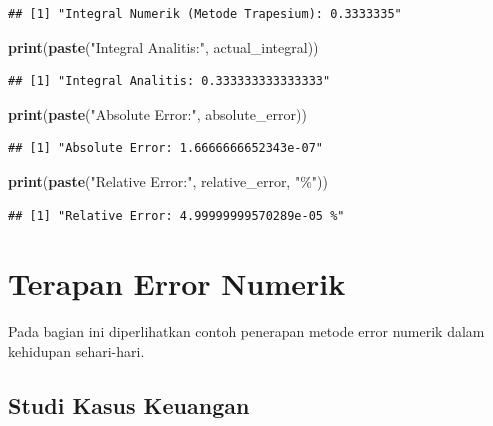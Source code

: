 \documentclass[
]{book}
\newenvironment{Shaded}{\begin{snugshade}}{\end{snugshade}}
\newcommand{\FunctionTok}[1]{\textcolor[rgb]{0.13,0.29,0.53}{\textbf{#1}}}
\newcommand{\NormalTok}[1]{#1}
\newcommand{\StringTok}[1]{\textcolor[rgb]{0.31,0.60,0.02}{#1}}
\theoremstyle{definition}
\theoremstyle{definition}
\theoremstyle{definition}
\theoremstyle{definition}
\theoremstyle{remark}
\begin{document}
\begin{verbatim}
## [1] "Integral Numerik (Metode Trapesium): 0.3333335"
\end{verbatim}

\begin{Shaded}
\begin{Highlighting}[]
\FunctionTok{print}\NormalTok{(}\FunctionTok{paste}\NormalTok{(}\StringTok{"Integral Analitis:"}\NormalTok{, actual\_integral))}
\end{Highlighting}
\end{Shaded}

\begin{verbatim}
## [1] "Integral Analitis: 0.333333333333333"
\end{verbatim}

\begin{Shaded}
\begin{Highlighting}[]
\FunctionTok{print}\NormalTok{(}\FunctionTok{paste}\NormalTok{(}\StringTok{"Absolute Error:"}\NormalTok{, absolute\_error))}
\end{Highlighting}
\end{Shaded}

\begin{verbatim}
## [1] "Absolute Error: 1.6666666652343e-07"
\end{verbatim}

\begin{Shaded}
\begin{Highlighting}[]
\FunctionTok{print}\NormalTok{(}\FunctionTok{paste}\NormalTok{(}\StringTok{"Relative Error:"}\NormalTok{, relative\_error, }\StringTok{"\%"}\NormalTok{))}
\end{Highlighting}
\end{Shaded}

\begin{verbatim}
## [1] "Relative Error: 4.99999999570289e-05 %"
\end{verbatim}

\hypertarget{terapan-error-numerik}{%
\section{Terapan Error Numerik}\label{terapan-error-numerik}}

Pada bagian ini diperlihatkan contoh penerapan metode error numerik dalam kehidupan sehari-hari.

\hypertarget{studi-kasus-keuangan}{%
\subsection{Studi Kasus Keuangan}\label{studi-kasus-keuangan}}
\end{document}
